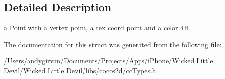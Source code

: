 \subsection{Detailed Description}
a Point with a vertex point, a tex coord point and a color 4\-B 

The documentation for this struct was generated from the following file\-:\begin{DoxyCompactItemize}
\item 
/\-Users/andygirvan/\-Documents/\-Projects/\-Apps/i\-Phone/\-Wicked Little Devil/\-Wicked Little Devil/libs/cocos2d/\hyperlink{cc_types_8h}{cc\-Types.\-h}\end{DoxyCompactItemize}
